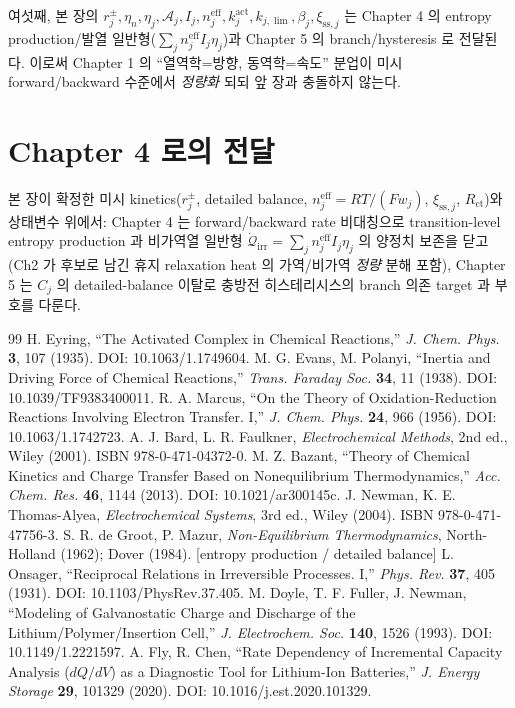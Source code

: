 \documentclass[11pt,a4paper]{article}
\newcommand{\eff}{\mathrm{eff}}
\newcommand{\irr}{\mathrm{irr}}
\newcommand{\ct}{\mathrm{ct}}
\newcommand{\sstat}{\mathrm{ss}}
\newcommand{\brk}{\discretionary{}{}{}}%
\begin{document}
여섯째, 본 장의 $r_j^\pm,\eta_n,\eta_j,\mathcal A_j,I_j,n_j^{\eff},k_j^{\mathrm{act}},k_{j,\lim},\beta_j,\xi_{\sstat,j}$ 는
Chapter 4 의 entropy production/발열 일반형($\sum_j n_j^{\eff}I_j\eta_j$)과 Chapter 5 의 branch/hysteresis 로
전달된다. 이로써 Chapter 1 의 ``열역학=방향, 동역학=속도'' 분업이 미시 forward/backward 수준에서 \emph{정량화}
되되 앞 장과 충돌하지 않는다.

\section*{Chapter 4 로의 전달}
본 장이 확정한 미시 kinetics($r_j^\pm$, detailed balance, $n_j^{\eff}=RT/(Fw_j)$, $\xi_{\sstat,j}$, $R_\ct$)와
상태변수 위에서: Chapter 4 는 forward/backward rate 비대칭으로 transition-level entropy production 과 비가역열
일반형 $\dot{\mathcal Q}_\irr=\sum_j n_j^{\eff}I_j\eta_j$ 의 양정치 보존을 닫고(Ch2 가 후보로 남긴 휴지
relaxation heat 의 가역/비가역 \emph{정량} 분해 포함), Chapter 5 는 $C_j$ 의 detailed-balance 이탈로 충방전
히스테리시스의 branch 의존 target 과 부호를 다룬다.

\begin{thebibliography}{99}
 H. Eyring, ``The Activated Complex in Chemical Reactions,'' \emph{J. Chem. Phys.}
  \textbf{3}, 107 (1935). DOI: 10.1063/1.1749604.
 M. G. Evans, M. Polanyi, ``Inertia and Driving Force of Chemical Reactions,''
  \emph{Trans. Faraday Soc.} \textbf{34}, 11 (1938). DOI: 10.1039/TF9383400011.
 R. A. Marcus, ``On the Theory of Oxidation-Reduction Reactions Involving Electron
  Transfer. I,'' \emph{J. Chem. Phys.} \textbf{24}, 966 (1956). DOI: 10.1063/\brk 1.1742723.
 A. J. Bard, L. R. Faulkner, \emph{Electrochemical Methods}, 2nd ed., Wiley (2001).
  ISBN 978-0-\brk 471-04372-0.
 M. Z. Bazant, ``Theory of Chemical Kinetics and Charge Transfer Based on
  Nonequilibrium Thermodynamics,'' \emph{Acc. Chem. Res.} \textbf{46}, 1144 (2013).
  DOI: 10.1021/\brk ar300145c.
 J. Newman, K. E. Thomas-Alyea, \emph{Electrochemical Systems}, 3rd ed., Wiley (2004).
  ISBN 978-0-\brk 471-47756-3.
 S. R. de Groot, P. Mazur, \emph{Non-Equilibrium Thermodynamics},
  North-Holland (1962); Dover (1984). [entropy production / detailed balance]
 L. Onsager, ``Reciprocal Relations in Irreversible Processes. I,'' \emph{Phys. Rev.}
  \textbf{37}, 405 (1931). DOI: 10.1103/\brk PhysRev.37.405.
 M. Doyle, T. F. Fuller, J. Newman, ``Modeling of Galvanostatic Charge and Discharge
  of the Lithium/Polymer/Insertion Cell,'' \emph{J. Electrochem. Soc.} \textbf{140}, 1526 (1993).
  DOI: 10.1149/\brk 1.2221597.
 A. Fly, R. Chen, ``Rate Dependency of Incremental Capacity Analysis ($dQ/dV$) as a
  Diagnostic Tool for Lithium-Ion Batteries,'' \emph{J. Energy Storage} \textbf{29}, 101329 (2020).
  DOI: 10.1016/\brk j.est.2020.101329.
\end{thebibliography}
\end{document}
